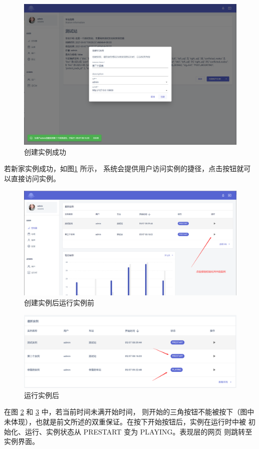 \begin{figure}[htbp!]
  \centering
  \includegraphics[width=\textwidth]{figures/png/dialog_succ.png}
  \caption{\label{dialog_succ}创建实例成功}
\end{figure}

若新家实例成功，如图\ref{dialog_succ} 所示，
系统会提供用户访问实例的捷径，点击按钮就可以直接访问实例。

\begin{figure}[htbp!]
  \centering
  \includegraphics[width=\textwidth]{figures/png/after_create.png}
  \caption{\label{after_create}创建实例后运行实例前}
\end{figure}


\begin{figure}[htbp!]
  \centering
  \includegraphics[width=\textwidth]{figures/png/3rd.png}
  \caption{\label{3rd}运行实例后}
\end{figure}

在图 \ref{after_create} 和 \ref{3rd}  中，若当前时间未满开始时间，
则开始的三角按钮不能被按下（图中未体现），也就是前文所述的双重保证。在按下开始按钮后，实例在运行时中被
初始化、运行、实例状态从 PRESTART 变为 PLAYING。表现层的网页
则跳转至实例界面。


